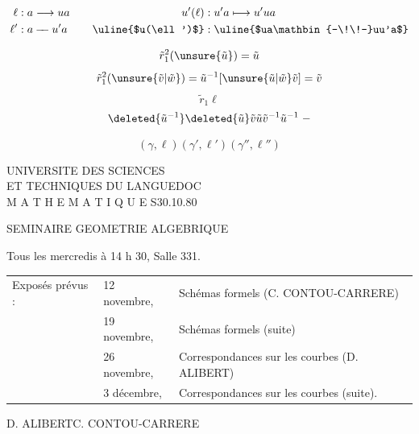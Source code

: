 \[
\begin{aligned}
\ell &: a\longrightarrow ua\\
\ell' &: a\mathbin{-\!\!-}u'a
\end{aligned}
\qquad
\begin{aligned}
u'(\ell)&:u'a\longmapsto u'ua\\
\uline{$u(\ell')$}&:\uline{$ua\mathbin{-\!\!-}uu'a$}
\end{aligned}
\]


\[
\tilde r_1^2(\unsure{\tilde u})=\tilde u
\]
\[
\tilde r_1^2(\unsure{\tilde v|\tilde w})=\tilde u^{-1}[\unsure{\tilde u|\tilde w}\tilde v]=\tilde v
\]
\[
\tilde r_1\ell
\]
\[
\deleted{\tilde u^{-1}}\deleted{\tilde u}\tilde v\tilde u\tilde v^{-1}\tilde u^{-1}\;-
\]

\[
(\gamma,\ell)(\gamma',\ell')(\gamma'',\ell'')
\]

UNIVERSITE DES SCIENCES\\
ET TECHNIQUES DU LANGUEDOC\\
M A T H E M A T I Q U E S\hfill 30.10.80

\begin{center}
SEMINAIRE GEOMETRIE ALGEBRIQUE
\end{center}

Tous les mercredis à 14 h 30, Salle 331.

\begin{tabular}{lll}
Exposés prévus : & 12 novembre, & Schémas formels (C. CONTOU-CARRERE)\\
& 19 novembre, & Schémas formels (suite)\\
& 26 novembre, & Correspondances sur les courbes (D. ALIBERT)\\
& 3 décembre, & Correspondances sur les courbes (suite).
\end{tabular}

\begin{flushright}
D. ALIBERT\qquad C. CONTOU-CARRERE
\end{flushright}

